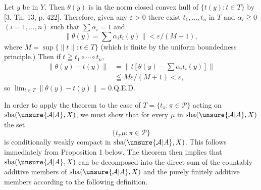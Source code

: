 Let $y$ be in $Y$. Then $\theta(y)$ is in the norm closed convex hull of $\{t(y):t\in T\}$ by [3, Th. 13, p. 422]. Therefore, given any $\varepsilon>0$ there exist $t_1,\ldots,t_n$ in $T$ and $\alpha_i\geqq0$ $(i=1,\ldots,n)$ such that $\sum\alpha_i=1$ and
\[
\|\theta(y)=\sum\alpha_it_i(y)\|<\varepsilon/(M+1),
\]
where $M=\sup\{\|t\|:t\in T\}$ (which is finite by the uniform boundedness principle.) Then if $t\geqq t_1\circ\cdots\circ t_n$,
\[
\begin{aligned}
\|\theta(y)-t(y)\|&=\|t[\theta(y)-\sum\alpha_it_i(y)]\|\\
&\leqq M\varepsilon/(M+1)<\varepsilon,
\end{aligned}
\]
so $\lim_{t\in T}\|\theta(y)-t(y)\|=0$.\hfill Q.E.D.

In order to apply the theorem to the case of $T=\{t_\pi:\pi\in\mathcal P\}$ acting on $\mathrm{sba}(\unsure{\mathcal A|A},X)$, we must show that for every $\mu$ in $\mathrm{sba}(\unsure{\mathcal A|A},X)$ the set
\[
\{t_\pi\mu:\pi\in\mathcal P\}
\]
is conditionally weakly compact in $\mathrm{sba}(\unsure{\mathcal A|A},X)$. This follows immediately from Proposition 1 below. The theorem then implies that $\mathrm{sba}(\unsure{\mathcal A|A},X)$ can be decomposed into the direct sum of the countably additive members of $\mathrm{sba}(\unsure{\mathcal A|A},X)$ and the purely finitely additive members according to the following definition.
